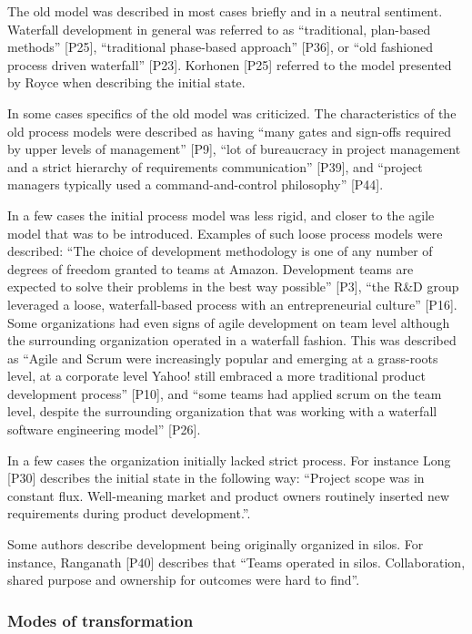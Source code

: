 The old model was described in most cases briefly and in a neutral sentiment.
Waterfall development in general was referred to as ``traditional, plan-based
methods'' [P25], ``traditional phase-based approach'' [P36], or ``old fashioned
process driven waterfall'' [P23]. Korhonen [P25] referred to the model presented
by Royce \cite{Royce1970} when describing the initial state.

In some cases specifics of the old model was criticized. The characteristics of
the old process models were described as having ``many gates and sign-offs
required by upper levels of management'' [P9], ``lot of bureaucracy in project
management and a strict hierarchy of requirements communication'' [P39], and
``project managers typically used a command-and-control philosophy'' [P44].

In a few cases the initial process model was less rigid, and closer to the agile
model that was to be introduced. Examples of such loose process models were
described: ``The choice of development methodology is one of any number of
degrees of freedom granted to teams at Amazon. Development teams are expected to
solve their problems in the best way possible'' [P3], ``the R\&D group leveraged
a loose, waterfall-based process with an entrepreneurial culture'' [P16]. Some
organizations had even signs of agile development on team level although the
surrounding organization operated in a waterfall fashion. This was described as
``Agile and Scrum were increasingly popular and emerging at a grass-roots level,
at a corporate level Yahoo! still embraced a more traditional product
development process'' [P10], and ``some teams had applied scrum on the team
level, despite the surrounding organization that was working with a waterfall
software engineering model'' [P26].

In a few cases the organization initially lacked strict process. For instance
Long [P30] describes the initial state in the following way: ``Project scope was
in constant flux. Well-meaning market and product owners routinely inserted new
requirements during product development.''.

Some authors describe development being originally organized in silos. For
instance, Ranganath [P40] describes that ``Teams operated in silos.
Collaboration, shared purpose and ownership for outcomes were hard to find''.


\subsubsection{Modes of transformation}

